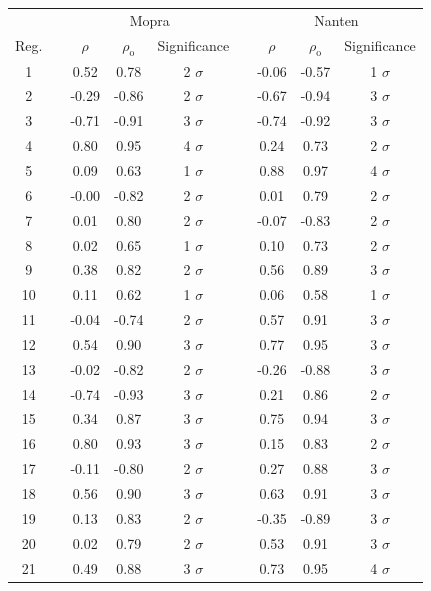 \documentclass[12pt,a4paper]{article}
\begin{document}
\begin{table}[H] 
	\centering
	\begin{tabular}{ccccccccc}
		\toprule 
		&&
		\multicolumn{3}{c}{Mopra} 
		&&
		\multicolumn{3}{c}{Nanten} \\
		\cline{2-5} \cline{7-9} 
		Reg. && $\rho$ & $\rho_\mathrm{o}$ & Significance && $\rho$ & $\rho_\mathrm{o}$ & Significance \\
		\hline 
		1 && 0.52 & 0.78 & 2 $\sigma$ && -0.06 & -0.57 & 1 $\sigma$ \\
		2 && -0.29 & -0.86 & 2 $\sigma$ && -0.67 & -0.94 & 3 $\sigma$ \\
		3 && -0.71 & -0.91 & 3 $\sigma$ && -0.74 & -0.92 & 3 $\sigma$ \\
		4 && 0.80 & 0.95 & 4 $\sigma$ && 0.24 & 0.73 & 2 $\sigma$ \\
		5 && 0.09 & 0.63 & 1 $\sigma$ && 0.88 & 0.97 & 4 $\sigma$ \\
		6 && -0.00 & -0.82 & 2 $\sigma$ && 0.01 & 0.79 & 2 $\sigma$ \\ 
		7 && 0.01 & 0.80 & 2 $\sigma$ && -0.07 & -0.83 & 2 $\sigma$ \\
		8 && 0.02 & 0.65 & 1 $\sigma$ && 0.10 & 0.73 & 2 $\sigma$ \\
		9 && 0.38 & 0.82 & 2 $\sigma$ && 0.56 & 0.89 & 3 $\sigma$ \\
		10 && 0.11 & 0.62 & 1 $\sigma$ && 0.06 & 0.58 & 1 $\sigma$ \\
		11 && -0.04 & -0.74 & 2 $\sigma$ && 0.57 & 0.91 & 3 $\sigma$ \\
		12 && 0.54 & 0.90 & 3 $\sigma$ && 0.77 & 0.95 & 3 $\sigma$ \\
		13 && -0.02 & -0.82 & 2 $\sigma$ && -0.26 & -0.88 & 3 $\sigma$ \\
		14 && -0.74 & -0.93 & 3 $\sigma$ && 0.21 & 0.86 & 2 $\sigma$ \\
		15 && 0.34 & 0.87 & 3 $\sigma$ && 0.75 & 0.94 & 3 $\sigma$ \\
		16 && 0.80 & 0.93 & 3 $\sigma$ && 0.15 & 0.83 & 2 $\sigma$ \\ 
		17 && -0.11 & -0.80 & 2 $\sigma$ && 0.27 & 0.88 & 3 $\sigma$ \\
		18 && 0.56 & 0.90 & 3 $\sigma$ && 0.63 & 0.91 & 3 $\sigma$ \\
		19 && 0.13 & 0.83 & 2 $\sigma$ && -0.35 & -0.89 & 3 $\sigma$ \\
		20 && 0.02 & 0.79 & 2 $\sigma$ && 0.53 & 0.91 & 3 $\sigma$ \\
		21 && 0.49 & 0.88 & 3 $\sigma$ && 0.73 & 0.95 & 4 $\sigma$ \\

\end{tabular}
\end{table}
\end{document}
